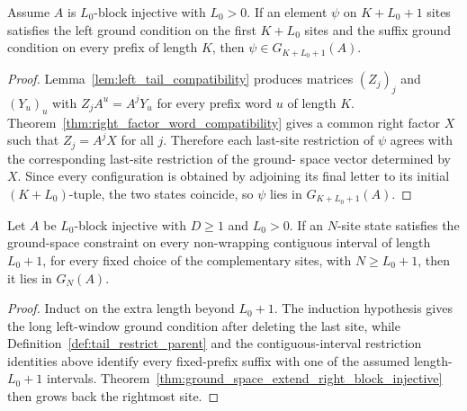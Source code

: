 \begin{theorem}%
    \label{thm:ground_space_extend_right_block_injective}
    \leanok
    Assume $A$ is $L_0$-block injective with $L_0 > 0$. If an element $\psi$
    on $K + L_0 + 1$ sites satisfies the left ground condition on
    the first $K + L_0$ sites and the suffix ground condition on every prefix of
    length $K$, then $\psi \in G_{K + L_0 + 1}(A)$.
\end{theorem}

\begin{proof}
    \leanok
    Lemma~\ref{lem:left_tail_compatibility} produces matrices $(Z_j)_j$ and
    $(Y_u)_u$ with $Z_j A^u = A^j Y_u$ for every prefix word $u$ of length $K$.
    Theorem~\ref{thm:right_factor_word_compatibility} gives a common right factor
    $X$ such that $Z_j = A^j X$ for all $j$. Therefore each last-site restriction
    of $\psi$ agrees with the corresponding last-site restriction of the ground-
    space vector determined by $X$. Since every configuration is obtained by
    adjoining its final letter to its initial $(K + L_0)$-tuple, the two states
    coincide, so $\psi$ lies in $G_{K + L_0 + 1}(A)$.
\end{proof}

\begin{theorem}%
    \label{thm:normal_open_chain_range_reduction}
    \leanok
    Let $A$ be $L_0$-block injective with $D \ge 1$ and $L_0 > 0$.
    If an $N$-site state satisfies the ground-space constraint on every
    non-wrapping contiguous interval of length $L_0+1$, for every fixed choice
    of the complementary sites, with $N \ge L_0+1$, then it lies in $G_N(A)$.
\end{theorem}

\begin{proof}
    \leanok
    Induct on the extra length beyond $L_0+1$. The induction hypothesis gives the
    long left-window ground condition after deleting the last site, while
    Definition~\ref{def:tail_restrict_parent} and the contiguous-interval
    restriction identities above identify every fixed-prefix suffix with one of
    the assumed length-$L_0+1$ intervals.
    Theorem~\ref{thm:ground_space_extend_right_block_injective} then
    grows back the rightmost site.
\end{proof}

